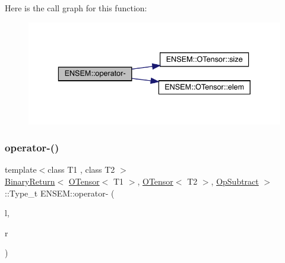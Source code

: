 Here is the call graph for this function\+:\nopagebreak
\begin{figure}[H]
\begin{center}
\leavevmode
\includegraphics[width=336pt]{de/d87/group__obstensor_gab017a217eb9e1e85386eb640bca457ab_cgraph}
\end{center}
\end{figure}
\mbox{\label{group__obstensor_gacbd7414e163d7986e5bcfb720e77b733}} 
\subsubsection{\texorpdfstring{operator-\/()}{operator-()}\hspace{0.1cm}{\footnotesize\ttfamily [2/4]}}
{\footnotesize\ttfamily template$<$class T1 , class T2 $>$ \\
\mbox{\hyperlink{structENSEM_1_1BinaryReturn}{Binary\+Return}}$<$ \mbox{\hyperlink{classENSEM_1_1OTensor}{O\+Tensor}}$<$ T1 $>$, \mbox{\hyperlink{classENSEM_1_1OTensor}{O\+Tensor}}$<$ T2 $>$, \mbox{\hyperlink{structENSEM_1_1OpSubtract}{Op\+Subtract}} $>$\+::Type\+\_\+t E\+N\+S\+E\+M\+::operator-\/ (\begin{DoxyParamCaption}\item[{const \mbox{\hyperlink{classENSEM_1_1OTensor}{O\+Tensor}}$<$ T1 $>$ \&}]{l,  }\item[{const \mbox{\hyperlink{classENSEM_1_1OTensor}{O\+Tensor}}$<$ T2 $>$ \&}]{r }\end{DoxyParamCaption})\hspace{0.3cm}{\ttfamily [inline]}}


